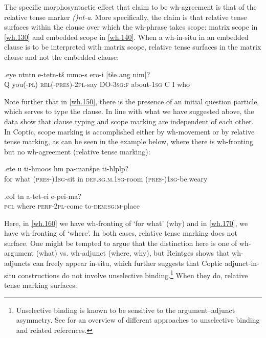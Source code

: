 \documentclass[charis]{glossa}
\begin{document}
The specific morphosyntactic effect that \cite{rlc:2006} claim to be wh-agreement is that of the relative tense marker \textit{(\textschwa)nt-a}. More specifically, the claim is that relative tense surfaces within the clause over which the wh-phrase takes scope: matrix scope in \ref{wh.130} and embedded scope in \ref{wh.140}. When a wh-in-situ in an embedded clause is to be interpreted with matrix scope, relative tense surfaces in the matrix clause and not the embedded clause:

\exg.\label{wh.150}eye {\textschwa}nt{\textopeno}nt{\textschwa}n e-tet{\textschwa}n-t\v{s}{\textopeno} {\textschwa}mmo-s ero-i [t\v{s}e ang nim]?\\
   Q you(\textsc{-pl}) \textsc{rel(-pres)-2pl}-say DO-\textsc{3sg:f} about-\textsc{1sg} C I who\\

Note further that in \ref{wh.150}, there is the presence of an initial question particle, which serves to type the clause. In line with what we have suggested above, the data show that clause typing and scope marking are independent of each other. In Coptic, scope marking is accomplished either by wh-movement or by relative tense marking, as can be seen in the example below, where there is wh-fronting but no wh-agreement (relative tense marking):


\exg.\label{wh.160}et{\textbeta}e u ti-hmoos h{\textschwa}m pa-man\v{s}{\textopeno}pe ti-hl{\textschwa}pl{\textopeno}p?\\
   for what (\textsc{pres-})\textsc{1sg}-sit in \textsc{def.sg.m.1sg}-room (\textsc{pres-})\textsc{1sg}-be.weary\\

\exg.\label{wh.170}e{\textbeta}ol t{\textopeno}n a-tet{\textschwa}-ei e-pei-ma?\\
   \textsc{pcl} where \textsc{perf-2pl}-come to-\textsc{dem:sg:m}-place\\

Here, in \ref{wh.160} we have wh-fronting of `for what' (why) and in \ref{wh.170}, we have wh-fronting of `where'. In both cases, relative tense marking does not surface. One might be tempted to argue that the distinction here is one of wh-argument (what) vs. wh-adjunct (where, why), but Reintges shows that wh-adjuncts can freely appear in-situ, which further suggests that Coptic adjunct-in-situ constructions do not involve unselective binding.\footnote{Unselective binding is known to be sensitive to the argument--adjunct asymmetry. See \cite{cheng:2009} for an overview of different approaches to unselective binding and related references.} When they do, relative tense marking surfaces:
\end{document}

